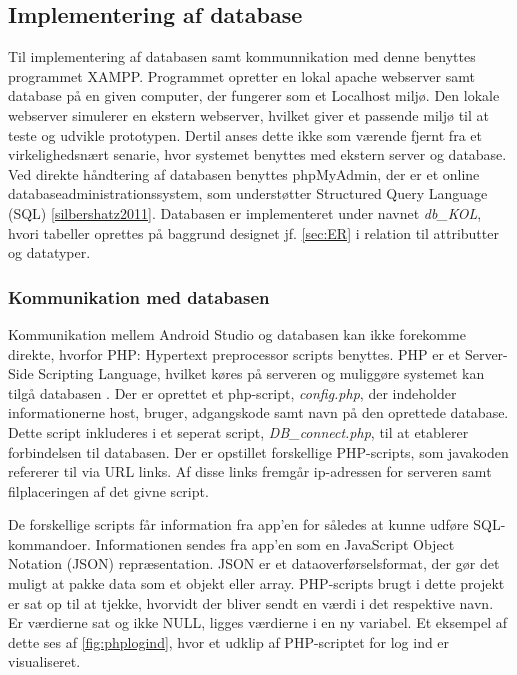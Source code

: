 \subsection{Implementering af database}

Til implementering af databasen samt kommunnikation med denne benyttes programmet XAMPP. Programmet opretter en lokal apache webserver samt database på en given computer, der fungerer som et Localhost miljø. Den lokale webserver simulerer en ekstern webserver, hvilket giver et passende miljø til at teste og udvikle prototypen. Dertil anses dette ikke som værende fjernt fra et virkelighedsnært senarie, hvor systemet benyttes med ekstern server og database.
Ved direkte håndtering af databasen benyttes phpMyAdmin, der er et online databaseadministrationssystem, som understøtter Structured Query Language (SQL) \autoref{silbershatz2011}. 
Databasen er implementeret under navnet \textit{db\_KOL}, hvori tabeller oprettes på baggrund designet jf. \autoref{sec:ER} i relation til attributter og datatyper.

\subsubsection{Kommunikation med databasen}
Kommunikation mellem Android Studio og databasen kan ikke forekomme direkte, hvorfor PHP: Hypertext preprocessor scripts benyttes. PHP er et Server-Side Scripting Language, hvilket køres på serveren og muliggøre systemet kan tilgå databasen \citep{silbershatz2011}. 
Der er oprettet et php-script, \textit{config.php}, der indeholder informationerne host, bruger, adgangskode samt navn på den oprettede database. Dette script inkluderes i et seperat script, \textit{DB\_connect.php}, til at etablerer forbindelsen til databasen. Der er opstillet forskellige PHP-scripts, som javakoden refererer til via URL links. Af disse links fremgår ip-adressen for serveren samt filplaceringen af det givne script. 

De forskellige scripts får information fra app'en for således at kunne udføre SQL-kommandoer. Informationen sendes fra app'en som en JavaScript Object Notation (JSON) repræsentation. JSON er et dataoverførselsformat, der  gør det muligt at pakke data som et objekt eller array. PHP-scripts brugt i dette projekt er sat op til at tjekke, hvorvidt der bliver sendt en værdi i det respektive navn. Er værdierne sat og ikke NULL, ligges værdierne i en ny variabel. Et eksempel af dette ses af \autoref{fig:phplogind}, hvor et udklip af PHP-scriptet for log ind er visualiseret. 


